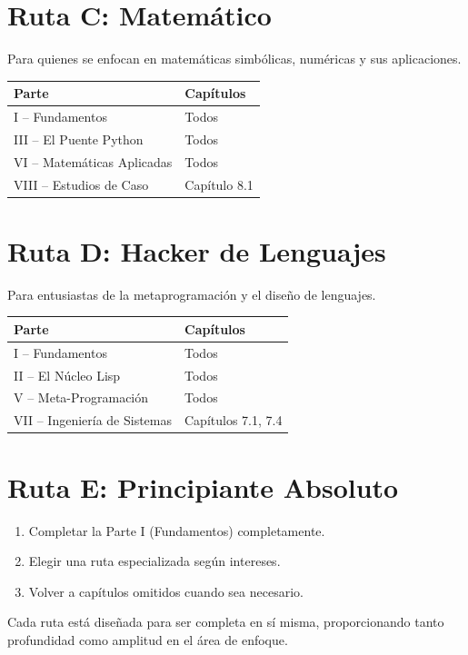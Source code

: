 \section{Ruta C: Matemático}

Para quienes se enfocan en matemáticas simbólicas, numéricas y sus
aplicaciones.

\begin{center}
\begin{tabular}{ll}
\toprule
\textbf{Parte} & \textbf{Capítulos} \\
\midrule
I -- Fundamentos & Todos \\
III -- El Puente Python & Todos \\
VI -- Matemáticas Aplicadas & Todos \\
VIII -- Estudios de Caso & Capítulo 8.1 \\
\bottomrule
\end{tabular}
\end{center}

\section{Ruta D: Hacker de Lenguajes}

Para entusiastas de la metaprogramación y el diseño de lenguajes.

\begin{center}
\begin{tabular}{ll}
\toprule
\textbf{Parte} & \textbf{Capítulos} \\
\midrule
I -- Fundamentos & Todos \\
II -- El Núcleo Lisp & Todos \\
V -- Meta-Programación & Todos \\
VII -- Ingeniería de Sistemas & Capítulos 7.1, 7.4 \\
\bottomrule
\end{tabular}
\end{center}

\section{Ruta E: Principiante Absoluto}

\begin{enumerate}
\item Completar la Parte I (Fundamentos) completamente.
\item Elegir una ruta especializada según intereses.
\item Volver a capítulos omitidos cuando sea necesario.
\end{enumerate}

Cada ruta está diseñada para ser completa en sí misma, proporcionando tanto
profundidad como amplitud en el área de enfoque.

